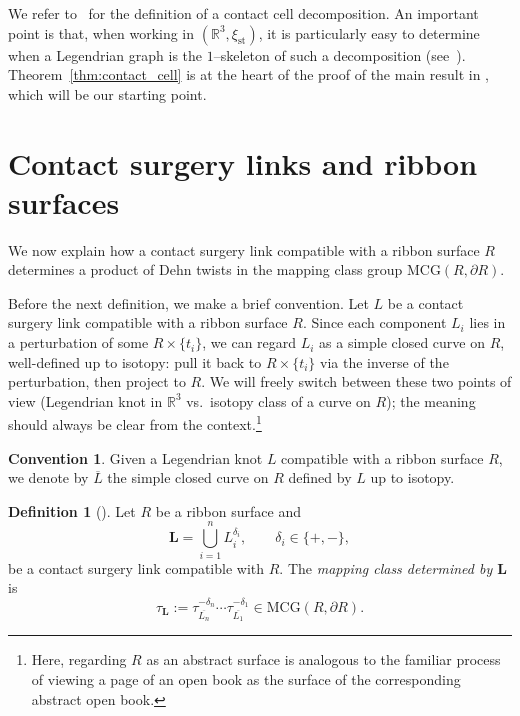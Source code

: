 \documentclass{amsart}
\numberwithin{equation}{section}
\numberwithin{figure}{section}
\theoremstyle{definition}
\newtheorem{definition}[theorem]{Definition}
\newtheorem{convention}[theorem]{Convention}
\theoremstyle{remark}
\newcommand{\R}{\mathbb{R}}
\let\oldtau\tau
\renewcommand{\tau}{\oldtau}
\let\olddxi\xi %
\renewcommand{\xi}{\olddxi}
\newcommand{\xist}{\olddxi_{\mathrm{st}}}
\begin{document}
We refer to~\cite{Etnyre06} for the definition of a contact cell decomposition. 
An important point is that, when working in $(\R^3,\xist)$, it is particularly easy to determine when a Legendrian graph is the $1$--skeleton of such a decomposition (see~\cite{Avdek13}). 
Theorem~\ref{thm:contact_cell} is at the heart of the proof of the main result in \cite[Theorem 1.10]{Avdek13}, which will be our starting point.

\section{Contact surgery links and ribbon surfaces}\label{sec:ribbon_moves_sec}

We now explain how a contact surgery link compatible with a ribbon surface $R$ determines a product of Dehn twists in the mapping class group $\mathrm{MCG}(R,\partial R)$.

Before the next definition, we make a brief convention. Let $L$ be a contact surgery link compatible with a ribbon surface $R$. Since each component $L_i$ lies in a perturbation of some $R\times\{t_i\}$, we can regard $L_i$ as a simple closed curve on $R$, well-defined up to isotopy: pull it back to $R\times\{t_i\}$ via the inverse of the perturbation, then project to $R$.
We will freely switch between these two points of view (Legendrian knot in $\R^3$ vs.\ isotopy class of a curve on $R$); the meaning should always be clear from the context.\footnote{Here, regarding $R$ as an abstract surface is analogous to the familiar process of viewing a page of an open book as the surface of the corresponding abstract open book.}

\begin{convention}
  Given a Legendrian knot $L$ compatible with a ribbon surface $R$, we denote by $\overline{L}$ the simple closed curve on $R$ defined by $L$ up to isotopy.
\end{convention}

\begin{definition}[{\cite[Definition~6.1]{Avdek13}}]\label{def:mapping_class_determined}
  Let $R$ be a ribbon surface and
  \[
    \boldsymbol{L}
    =
    \bigcup_{i=1}^n L_i^{\delta_i}, 
    \qquad
    \delta_i\in\{+,-\},
  \]
  be a contact surgery link compatible with $R$.  
The \emph{mapping class determined by $\boldsymbol{L}$} is
  \[
    \tau_{\scriptscriptstyle{\boldsymbol{L}}}
    :=
    \tau_{\scriptscriptstyle{\overline{L_n}}}^{-\delta_n}
    \cdots
    \tau_{\scriptscriptstyle{\overline{L_1}}}^{-\delta_1}
    \in \mathrm{MCG}(R,\partial R).
  \]
\end{definition}
\end{document}
